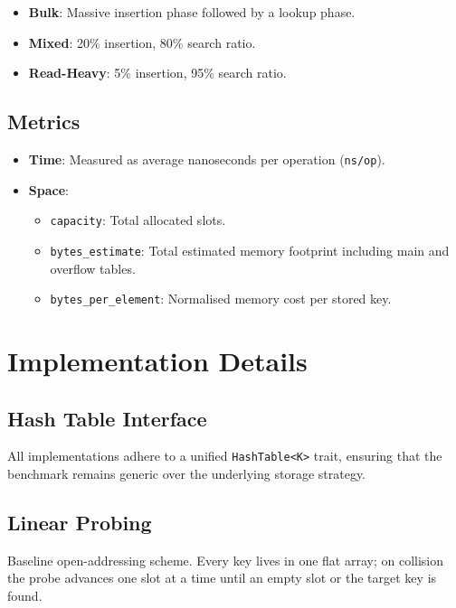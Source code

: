 \documentclass[11pt,a4paper]{article}
\begin{document}
\begin{itemize}
  \item \textbf{Bulk}: Massive insertion phase followed by a lookup phase.
  \item \textbf{Mixed}: 20\% insertion, 80\% search ratio.
  \item \textbf{Read-Heavy}: 5\% insertion, 95\% search ratio.
\end{itemize}

\subsection{Metrics}

\begin{itemize}
  \item \textbf{Time}: Measured as average nanoseconds per operation (\texttt{ns/op}).
  \item \textbf{Space}:
    \begin{itemize}
      \item \texttt{capacity}: Total allocated slots.
      \item \texttt{bytes\_estimate}: Total estimated memory footprint including main and overflow tables.
      \item \texttt{bytes\_per\_element}: Normalised memory cost per stored key.
    \end{itemize}
\end{itemize}

\section{Implementation Details}

\subsection{Hash Table Interface}

All implementations adhere to a unified \texttt{HashTable<K>} trait, ensuring that the benchmark remains generic over the underlying storage strategy.

\subsection{Linear Probing}

Baseline open-addressing scheme. Every key lives in one flat array; on collision the probe
advances one slot at a time until an empty slot or the target key is found.
\end{document}
